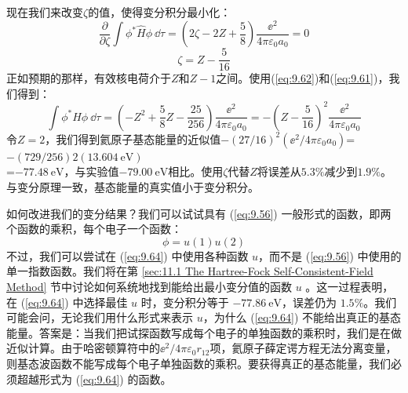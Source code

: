     现在我们来改变$\zeta$的值，使得变分积分最小化：
    \begin{equation*}
        \frac{\partial}{\partial \zeta} \int \phi^* \hat{H} \phi \: \dd \tau = \left(2\zeta - 2Z + \frac{5}{8}\right)\frac{\ee ^2}{4\pi\varepsilon_0a_0} = 0
    \end{equation*}
    \begin{equation}
        \zeta = Z - \frac{5}{16}
        \label{eq:9.62}
    \end{equation}
    正如预期的那样，有效核电荷介于$Z$和$Z-1$之间。使用(\ref{eq:9.62})和(\ref{eq:9.61})，我们得到：
    \begin{equation}
        \int \phi^* \hat{H} \phi \: \dd \tau = \left(-Z^2 + \frac{5}{8}Z - \frac{25}{256}\right)\frac{\ee ^2}{4\pi\varepsilon_0a_0} = -\left(Z - \frac{5}{16}\right)^2\frac{\ee ^2}{4\pi\varepsilon_0a_0}
        \label{eq:9.63}
    \end{equation}
    令$Z=2$，我们得到氦原子基态能量的近似值$-\left(27/16\right)^2\left(\ee ^2 / 4\pi\varepsilon_0a_0\right)$=$-\left(729/256\right)2\left(13.604 \: \mathrm{eV}\right)$\\=$-77.48 \: \mathrm{eV}$，与实验值$-79.00 \: \mathrm{eV}$相比。使用$\zeta$代替$Z$将误差从$5.3\%$减少到$1.9\%$。与变分原理一致，基态能量的真实值小于变分积分。


    如何改进我们的变分结果？我们可以试试具有 (\ref{eq:9.56}) 一般形式的函数，即两个函数的乘积，每个电子一个函数：
    \begin{equation}
        \phi = u\left(1\right)u\left(2\right)
        \label{eq:9.64}
    \end{equation}
    不过，我们可以尝试在 (\ref{eq:9.64}) 中使用各种函数 $u$，而不是 (\ref{eq:9.56}) 中使用的单一指数函数。我们将在第 \ref{sec:11.1 The Hartree-Fock Self-Consistent-Field Method} 节中讨论如何系统地找到能给出最小变分值的函数 $u$ 。这一过程表明，在 (\ref{eq:9.64}) 中选择最佳 $u$ 时，变分积分等于 $-77.86 \:\mathrm{eV}$，误差仍为 $1.5\%$。我们可能会问，无论我们用什么形式来表示 $u$，为什么 (\ref{eq:9.64}) 不能给出真正的基态能量。答案是：当我们把试探函数写成每个电子的单独函数的乘积时，我们是在做近似计算。由于哈密顿算符中的$\ee ^2 / 4\pi\varepsilon_0r_{12}$项，氦原子薛定谔方程无法分离变量，则基态波函数不能写成每个电子单独函数的乘积。要获得真正的基态能量，我们必须超越形式为 (\ref{eq:9.64}) 的函数。


